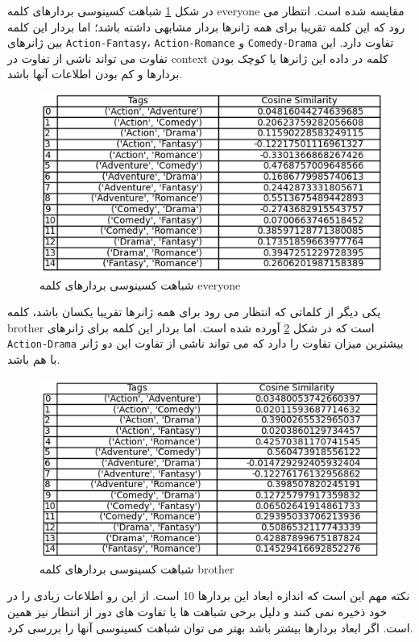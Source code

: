 در شکل 
\ref{fig12}
شباهت کسینوسی بردارهای کلمه
everyone
مقایسه شده است. انتظار می رود که این کلمه تقریبا برای همه ژانرها بردار مشابهی داشته باشد؛ اما بردار این کلمه بین ژانرهای 
\texttt{Action-Fantasy}،
\texttt{Action-Romance}
و
\texttt{Comedy-Drama}
تفاوت دارد. این تفاوت می تواند ناشی از تفاوت در context کلمه در داده این ژانرها یا کوچک بودن بردارها و کم بودن اطلاعات آنها باشد.
 \begin{figure}[H]
	\centering
	
	\includegraphics[width=1\textwidth,height=1\textheight,keepaspectratio]{../reports/word2vec/everyone}
	\caption{شباهت کسینوسی بردارهای کلمه everyone}
	\label{fig12}
	
\end{figure} 

یکی دیگر از کلماتی که انتظار می رود برای همه ژانرها تقریبا یکسان باشد، کلمه brother است که در شکل
\ref{fig13}
آورده شده است. اما بردار این کلمه برای ژانرهای
\texttt{Action-Drama}
بیشترین میزان تفاوت را دارد که می تواند ناشی از تفاوت این دو ژانر با هم باشد.


 \begin{figure}[H]
	\centering
	
	\includegraphics[width=1\textwidth,height=1\textheight,keepaspectratio]{../reports/word2vec/brother}
	\caption{شباهت کسینوسی بردارهای کلمه brother}
	\label{fig13}
	
\end{figure} 



نکته مهم این است که اندازه ابعاد این بردارها 10 است. از این رو اطلاعات زیادی را در خود ذخیره نمی کنند و دلیل برخی شباهت ها یا تفاوت های دور از انتظار نیز همین است. اگر ابعاد بردارها بیشتر باشد بهتر می توان شباهت کسینوسی آنها را بررسی کرد.